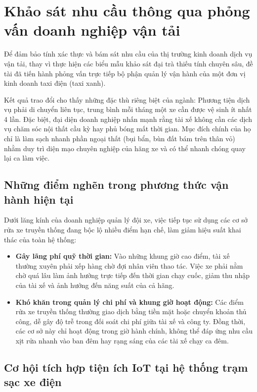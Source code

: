 \documentclass[../main.tex]{subfiles}
\begin{document}
\section{Khảo sát nhu cầu thông qua phỏng vấn doanh nghiệp vận tải}

Để đảm bảo tính xác thực và bám sát nhu cầu của thị trường kinh doanh dịch vụ vận tải, thay vì thực hiện các biểu mẫu khảo sát đại trà thiếu tính chuyên sâu, đề tài đã tiến hành phỏng vấn trực tiếp bộ phận quản lý vận hành của một đơn vị kinh doanh taxi điện (taxi xanh).

Kết quả trao đổi cho thấy những đặc thù riêng biệt của ngành: Phương tiện dịch vụ phải di chuyển liên tục, trung bình mỗi tháng một xe cần được vệ sinh ít nhất 4 lần. Đặc biệt, đại diện doanh nghiệp nhấn mạnh rằng tài xế không cần các dịch vụ chăm sóc nội thất cầu kỳ hay phủ bóng mất thời gian. Mục đích chính của họ chỉ là làm sạch nhanh phần ngoại thất (bụi bẩn, bùn đất bám trên thân vỏ) nhằm duy trì diện mạo chuyên nghiệp của hãng xe và có thể nhanh chóng quay lại ca làm việc.

\subsection{Những điểm nghẽn trong phương thức vận hành hiện tại}

Dưới lăng kính của doanh nghiệp quản lý đội xe, việc tiếp tục sử dụng các cơ sở rửa xe truyền thống đang bộc lộ nhiều điểm hạn chế, làm giảm hiệu suất khai thác của toàn hệ thống:
\begin{itemize}
    \item \textbf{Gây lãng phí quỹ thời gian:} Vào những khung giờ cao điểm, tài xế thường xuyên phải xếp hàng chờ đợi nhân viên thao tác. Việc xe phải nằm chờ quá lâu làm ảnh hưởng trực tiếp đến thời gian chạy cuốc, giảm thu nhập của tài xế và ảnh hưởng đến năng suất của cả hãng.
    \item \textbf{Khó khăn trong quản lý chi phí và khung giờ hoạt động:} Các điểm rửa xe truyền thống thường giao dịch bằng tiền mặt hoặc chuyển khoản thủ công, dễ gây độ trễ trong đối soát chi phí giữa tài xế và công ty. Đồng thời, các cơ sở này chỉ hoạt động trong giờ hành chính, không thể đáp ứng nhu cầu xịt rửa nhanh vào ban đêm hay rạng sáng của các tài xế chạy ca đêm.
\end{itemize}

\subsection{Cơ hội tích hợp tiện ích IoT tại hệ thống trạm sạc xe điện}
\end{document}
